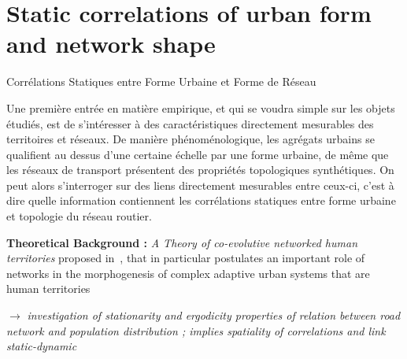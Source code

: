 

\newpage





\section[Static Correlations][Corrélations Statiques]{Static correlations of urban form and network shape}{Corrélations Statiques entre Forme Urbaine et Forme de Réseau}

\label{sec:staticcorrelations}





Une première entrée en matière empirique, et qui se voudra simple sur les objets étudiés, est de s'intéresser à des caractéristiques directement mesurables des territoires et réseaux. De manière phénoménologique, les agrégats urbains se qualifient au dessus d'une certaine échelle par une forme urbaine, de même que les réseaux de transport présentent des propriétés topologiques synthétiques. On peut alors s'interroger sur des liens directement mesurables entre ceux-ci, c'est à dire quelle information contiennent les corrélations statiques entre forme urbaine et topologie du réseau routier.



\textbf{Theoretical Background : } \textit{A Theory of co-evolutive networked human territories} proposed in~\cite{raimbault2016memoire}, that in particular postulates an important role of networks in the morphogenesis of complex adaptive urban systems that are human territories

\bigskip

$\rightarrow$ \textit{investigation of stationarity and ergodicity properties of relation between road network and population distribution ; implies spatiality of correlations and link static-dynamic}







